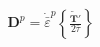 \documentclass[preview]{standalone}
\begin{document}
\begin{align*}
\mathbf{D}^p = \dot{\bar{\varepsilon}}^p\left\{ \frac{\tilde{\mathbf{T}}'}{2\bar{\tau}} \right\}
\end{align*}
\end{document}
